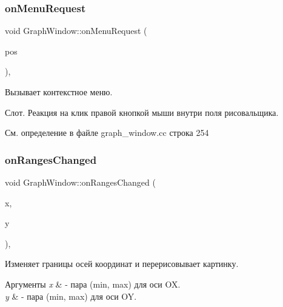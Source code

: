 \hypertarget{class_graph_window_a2cc0f9b9b91ccb7c3d203670467a556e}{}\label{class_graph_window_a2cc0f9b9b91ccb7c3d203670467a556e} 
\subsubsection{\texorpdfstring{on\+Menu\+Request}{onMenuRequest}}
{\footnotesize\ttfamily void Graph\+Window\+::on\+Menu\+Request (\begin{DoxyParamCaption}\item[{Q\+Point}]{pos }\end{DoxyParamCaption})\hspace{0.3cm}{\ttfamily [private]}, {\ttfamily [slot]}}



Вызывает контекстное меню. 

Слот. Реакция на клик правой кнопкой мыши внутри поля рисовальщика. 

См. определение в файле graph\+\_\+window.\+cc строка 254

\hypertarget{class_graph_window_a76559e3f41e482a43f715f519df4487c}{}\label{class_graph_window_a76559e3f41e482a43f715f519df4487c} 
\subsubsection{\texorpdfstring{on\+Ranges\+Changed}{onRangesChanged}}
{\footnotesize\ttfamily void Graph\+Window\+::on\+Ranges\+Changed (\begin{DoxyParamCaption}\item[{Math\+::\+Vector2}]{x,  }\item[{Math\+::\+Vector2}]{y }\end{DoxyParamCaption})\hspace{0.3cm}{\ttfamily [private]}, {\ttfamily [slot]}}



Изменяет границы осей координат и перерисовывает картинку. 


\begin{DoxyParams}{Аргументы}
{\em x} & -\/ пара (min, max) для оси OX. \\
\hline
{\em y} & -\/ пара (min, max) для оси OY. \\
\hline
\end{DoxyParams}


